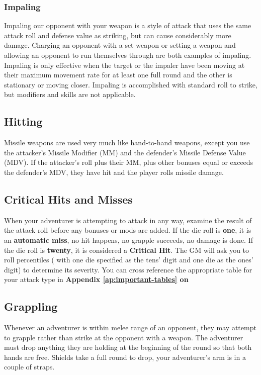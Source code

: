\begin{multicols*}{2}
\subsubsection{Impaling}
Impaling our opponent with your weapon is a style of attack that uses the same attack roll and defense value as striking, but can cause considerably more damage. Charging an opponent with a set weapon or setting a weapon and allowing an opponent to run themselves through are both examples of impaling. Impaling is only effective when the target or the impaler have been moving at their maximum movement rate for at least one full round and the other is stationary or moving closer. Impaling is accomplished with  standard roll to strike, but modifiers and skills are not applicable.
\subsection{Hitting}
Missile weapons are used very much like hand-to-hand weapons, except you use the attacker's Missile Modifier (MM) and the defender's Missile Defense Value (MDV). If the attacker's  roll plus their MM, plus other bonuses equal or exceeds the defender's MDV, they have hit and the player rolls missile damage.
\subsection{Critical Hits and Misses}
When your adventurer is attempting to attack in any way, examine the result of the attack roll before any bonuses or mods are added. If the die roll is \textbf{one}, it is an \textbf{automatic miss}, no hit happens, no grapple succeeds, no damage is
done. If the die roll is \textbf{twenty}, it is considered a \textbf{Critical Hit}. The GM will ask you to roll percentiles ( with one die specified as the tens' digit and one die as the ones' digit) to determine its severity. You can cross reference the appropriate table for your attack type in \textbf{Appendix \ref{ap:important-tables} on \tcpage{\pageref{critical-hits}}}
\subsection{Grappling}
Whenever an adventurer is within melee range of an opponent, they may attempt to grapple rather than strike at the opponent with a weapon. The adventurer must drop anything they are holding at the beginning of the round so that both hands are free. Shields take a full round to drop, your adventurer's arm is in a couple of straps.


\end{multicols*}
